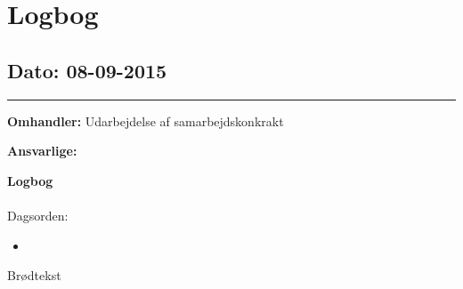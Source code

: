\chapter{Logbog}

\section{Dato: 08-09-2015 }
\hrule

\textbf{Omhandler:} Udarbejdelse af samarbejdskonkrakt 

\textbf{Ansvarlige:} 

\textbf{Logbog}
\\
\\
Dagsorden:
\begin{itemize}
	\item 
\end{itemize}

Brødtekst 
